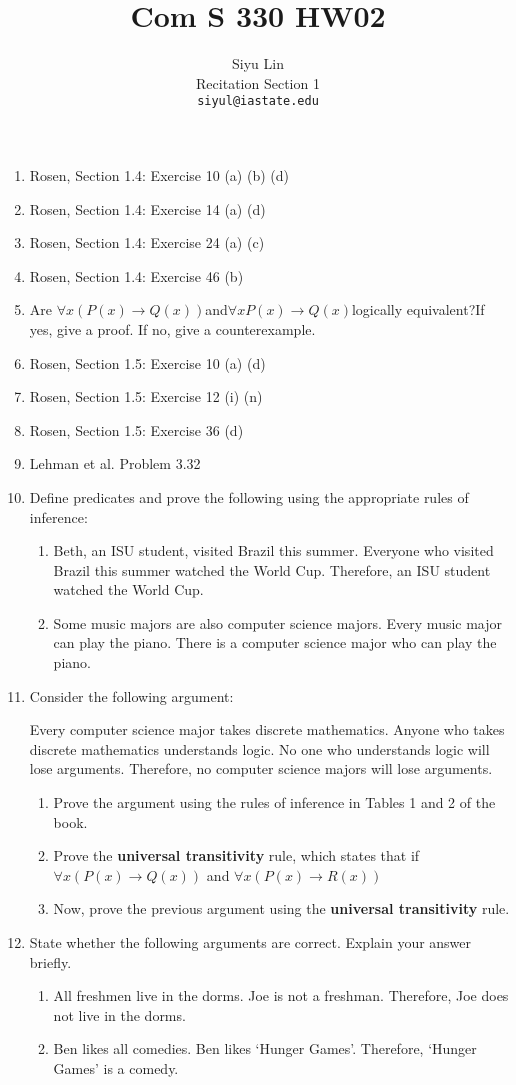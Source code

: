 \documentclass[12pt]{article}
\title{Com S 330 HW02}
\author{Siyu Lin \\Recitation Section 1\\ \texttt{siyul@iastate.edu}}
\begin{document}
\maketitle

\begin{enumerate}
\item Rosen, Section 1.4: Exercise 10 (a) (b) (d)
\item Rosen, Section 1.4: Exercise 14 (a) (d)
\item Rosen, Section 1.4: Exercise 24 (a) (c)
\item Rosen, Section 1.4: Exercise 46 (b)
\item Are $\forall x(P(x)\to Q(x))$and$\forall xP(x)\to Q(x)$logically equivalent?If yes, give a proof. If no, give a counterexample.
\item Rosen, Section 1.5: Exercise 10 (a) (d)
\item Rosen, Section 1.5: Exercise 12 (i) (n)
\item Rosen, Section 1.5: Exercise 36 (d)
\item Lehman et al. Problem 3.32
\item  Define predicates and prove the following using the appropriate rules of
inference:
\begin{enumerate}
    \item Beth, an ISU student, visited Brazil this summer. Everyone who visited Brazil this summer watched the World Cup. Therefore, an ISU student watched the World Cup.
    \item Some music majors are also computer science majors. Every music major can play the piano. There is a computer science major who can play the piano.
\end{enumerate}
\item Consider the following argument:
\begin{itshape}
Every computer science major takes discrete mathematics. Anyone who takes discrete mathematics understands logic. No one who understands logic will lose arguments. Therefore, no computer science majors will lose arguments.
\end{itshape}
\begin{enumerate}
\item Prove the argument using the rules of inference in Tables 1 and 2 of the book.
\item Prove the \textbf{universal transitivity} rule, which states that if $\forall x(P(x)\to Q(x))$ and $\forall x(P(x)\to R(x))$
\item Now, prove the previous argument using the \textbf{universal transitivity} rule.
\end{enumerate}
\item State whether the following arguments are correct. Explain your answer briefly.
\begin{enumerate}
\item All freshmen live in the dorms. Joe is not a freshman. Therefore, Joe does not live in the dorms.
\item  Ben likes all comedies. Ben likes ‘Hunger Games’. Therefore, ‘Hunger Games’ is a comedy.
\end{enumerate}

\end{enumerate}
\end{document}
